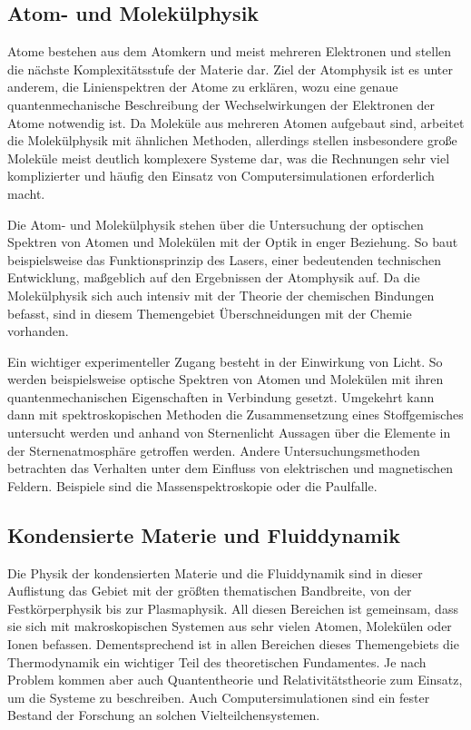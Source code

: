 \documentclass[titlepage, parkskip=full, twocolumn, landscape]{scrartcl}
\begin{document}
\subsection{Atom- und Molekülphysik}

Atome bestehen aus dem Atomkern und meist mehreren Elektronen und stellen die nächste Komplexitätsstufe der Materie dar. Ziel der Atomphysik ist es unter anderem, die Linienspektren der Atome zu erklären, wozu eine genaue quantenmechanische Beschreibung der Wechselwirkungen der Elektronen der Atome notwendig ist. Da Moleküle aus mehreren Atomen aufgebaut sind, arbeitet die Molekülphysik mit ähnlichen Methoden, allerdings stellen insbesondere große Moleküle meist deutlich komplexere Systeme dar, was die Rechnungen sehr viel komplizierter und häufig den Einsatz von Computersimulationen erforderlich macht.

Die Atom- und Molekülphysik stehen über die Untersuchung der optischen Spektren von Atomen und Molekülen mit der Optik in enger Beziehung. So baut beispielsweise das Funktionsprinzip des Lasers, einer bedeutenden technischen Entwicklung, maßgeblich auf den Ergebnissen der Atomphysik auf. Da die Molekülphysik sich auch intensiv mit der Theorie der chemischen Bindungen befasst, sind in diesem Themengebiet Überschneidungen mit der Chemie vorhanden.

Ein wichtiger experimenteller Zugang besteht in der Einwirkung von Licht. So werden beispielsweise optische Spektren von Atomen und Molekülen mit ihren quantenmechanischen Eigenschaften in Verbindung gesetzt. Umgekehrt kann dann mit spektroskopischen Methoden die Zusammensetzung eines Stoffgemisches untersucht werden und anhand von Sternenlicht Aussagen über die Elemente in der Sternenatmosphäre getroffen werden. Andere Untersuchungsmethoden betrachten das Verhalten unter dem Einfluss von elektrischen und magnetischen Feldern. Beispiele sind die Massenspektroskopie oder die Paulfalle.

\subsection{Kondensierte Materie und Fluiddynamik}

Die Physik der kondensierten Materie und die Fluiddynamik sind in dieser Auflistung das Gebiet mit der größten thematischen Bandbreite, von der Festkörperphysik bis zur Plasmaphysik. All diesen Bereichen ist gemeinsam, dass sie sich mit makroskopischen Systemen aus sehr vielen Atomen, Molekülen oder Ionen befassen. Dementsprechend ist in allen Bereichen dieses Themengebiets die Thermodynamik ein wichtiger Teil des theoretischen Fundamentes. Je nach Problem kommen aber auch Quantentheorie und Relativitätstheorie zum Einsatz, um die Systeme zu beschreiben. Auch Computersimulationen sind ein fester Bestand der Forschung an solchen Vielteilchensystemen.
\end{document}

